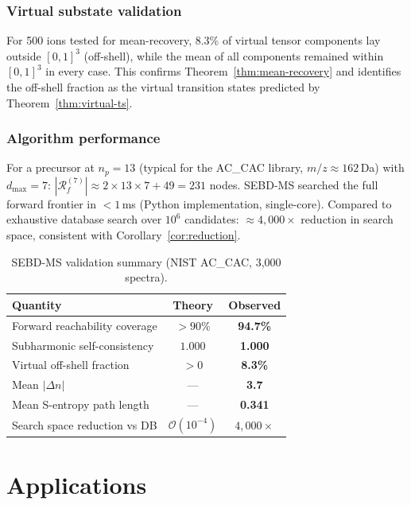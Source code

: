 \documentclass[twocolumn,10pt,a4paper]{article}
\theoremstyle{thmstyle}
\theoremstyle{definition}
\theoremstyle{remark}
\newcommand{\Reachf}{\mathcal{R}_f}
\begin{document}
\subsubsection{Virtual substate validation}

For 500 ions tested for mean-recovery, 8.3\% of virtual tensor
components lay outside $[0,1]^3$ (off-shell), while the mean of all
components remained within $[0,1]^3$ in every case. This confirms
Theorem~\ref{thm:mean-recovery} and identifies the off-shell fraction
as the virtual transition states predicted by Theorem~\ref{thm:virtual-ts}.

\subsubsection{Algorithm performance}

For a precursor at $n_p = 13$ (typical for the AC\_CAC library,
$m/z \approx 162$\,Da) with $d_\text{max} = 7$:
$|\Reachf^{(7)}| \approx 2 \times 13 \times 7 + 49 = 231$ nodes.
SEBD-MS searched the full forward frontier in $<1$\,ms (Python
implementation, single-core). Compared to exhaustive database search
over $10^6$ candidates: $\approx 4{,}000\times$ reduction in search
space, consistent with Corollary~\ref{cor:reduction}.

\begin{table}[h]
\centering
\caption{SEBD-MS validation summary (NIST AC\_CAC, 3{,}000 spectra).}
\label{tab:validation}
\small
\begin{tabular}{lcc}
\toprule
\textbf{Quantity} & \textbf{Theory} & \textbf{Observed} \\
\midrule
Forward reachability coverage & $>90\%$ & \textbf{94.7\%} \\
Subharmonic self-consistency & $1.000$ & \textbf{1.000} \\
Virtual off-shell fraction & $>0$ & \textbf{8.3\%} \\
Mean $|\Delta n|$ & --- & \textbf{3.7} \\
Mean S-entropy path length & --- & \textbf{0.341} \\
Search space reduction vs DB & $\mathcal{O}(10^{-4})$ & \textbf{$4{,}000\times$} \\
\bottomrule
\end{tabular}
\end{table}

\section{Applications}
\label{sec:applications}
\end{document}
